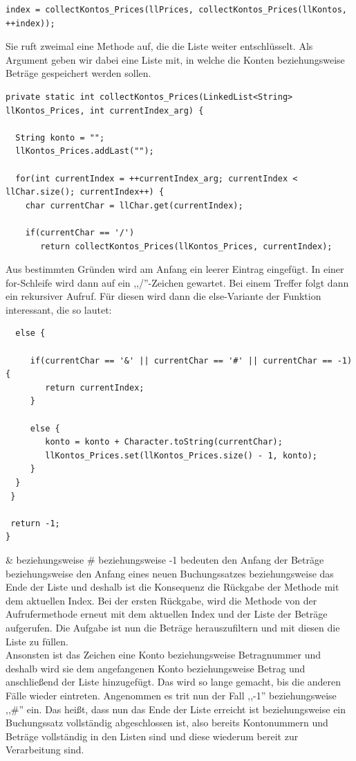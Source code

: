 \documentclass[12pt]{report}
\begin{document}
\begin{lstlisting}
index = collectKontos_Prices(llPrices, collectKontos_Prices(llKontos, ++index));
\end{lstlisting}

\noindent Sie ruft zweimal eine Methode auf, die die Liste weiter entschlüsselt. Als Argument geben wir dabei eine Liste mit, in welche die Konten beziehungsweise Beträge gespeichert werden sollen.

\begin{lstlisting}
private static int collectKontos_Prices(LinkedList<String> llKontos_Prices, int currentIndex_arg) {
		
  String konto = "";
  llKontos_Prices.addLast("");
		
  for(int currentIndex = ++currentIndex_arg; currentIndex < llChar.size(); currentIndex++) {
	char currentChar = llChar.get(currentIndex);
			
	if(currentChar == '/')
	   return collectKontos_Prices(llKontos_Prices, currentIndex);
\end{lstlisting}
\noindent Aus bestimmten Gründen wird am Anfang ein leerer Eintrag eingefügt. In einer for-Schleife wird dann auf ein ,,/''-Zeichen gewartet. Bei einem Treffer folgt dann ein rekursiver Aufruf. Für diesen wird dann die else-Variante der Funktion interessant, die so lautet:

\begin{lstlisting}
  else {
				
     if(currentChar == '&' || currentChar == '#' || currentChar == -1) {
        return currentIndex;
     }
				
     else {
        konto = konto + Character.toString(currentChar);
        llKontos_Prices.set(llKontos_Prices.size() - 1, konto);
     }
  }
 }
		
 return -1;
}
\end{lstlisting}
\noindent \& beziehungsweise \# beziehungsweise -1 bedeuten den Anfang der Beträge beziehungsweise den Anfang eines neuen Buchungssatzes beziehungsweise das Ende der Liste und deshalb ist die Konsequenz die Rückgabe der Methode mit dem aktuellen Index. Bei der ersten Rückgabe, wird die Methode von der Aufrufermethode erneut mit dem aktuellen Index und der Liste der Beträge aufgerufen. Die Aufgabe ist nun die Beträge herauszufiltern und mit diesen die Liste zu füllen.\\

\noindent Ansonsten ist das Zeichen eine Konto beziehungsweise Betragnummer und deshalb wird sie dem angefangenen Konto beziehungsweise Betrag und anschließend der Liste hinzugefügt. Das wird so lange gemacht, bis die anderen Fälle wieder eintreten. Angenommen es trit nun der Fall ,,-1'' beziehungsweise ,,\#'' ein. Das heißt, dass nun das Ende der Liste erreicht ist beziehungsweise ein Buchungssatz vollständig abgeschlossen ist, also bereits Kontonummern und Beträge vollständig in den Listen sind und diese wiederum bereit zur Verarbeitung sind.
\end{document}
